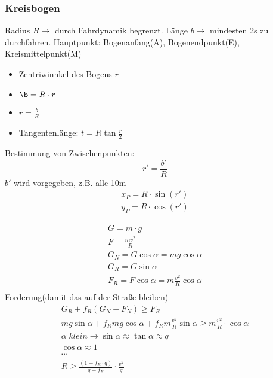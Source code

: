 \documentclass[12pt]{article}
\begin{document}
\subsubsection{Kreisbogen}
Radius $R \longrightarrow$ durch Fahrdynamik begrenzt. \newline
Länge $b \longrightarrow$ mindesten 2s zu durchfahren. \newline
\newline
Hauptpunkt: Bogenanfang(A), Bogenendpunkt(E), Kreismittelpunkt(M) \newline
\begin{itemize}
\item Zentriwinnkel des Bogens $r$
\item $\b = R \cdot r$
\item $r = \frac{b}{R}$
\item Tangentenlänge: $t = R \tan \frac{r}{2}$
\end{itemize}
Bestimmung von Zwischenpunkten:
\begin{equation*}
r' = \frac{b'}{R}
\end{equation*}
$b'$ wird vorgegeben, z.B. alle 10m
\begin{gather*}
x_P = R \cdot \sin(r') \\
y_P = R \cdot \cos(r')
\end{gather*}
\begin{figure*}[ht]\centering
\end{figure*}
\begin{gather*}
G = m \cdot g \\
F = \frac{mv^2}{R} \\
G_N = G\cos \alpha = mg \cos \alpha \\
G_R = G \sin \alpha \\
F_R = F \cos \alpha = m \frac{v^2}{R} \cos \alpha \\
\end{gather*}
Forderung(damit das auf der Straße bleiben)
\begin{gather*}
G_R + f_R(G_N + F_N) \geq F_R \\
mg \sin \alpha + f_R mg \cos \alpha + f_R m \frac{v^2}{R} \sin \alpha \geq m\frac{v^2}{R} \cdot \cos \alpha \\
\alpha\; klein \longrightarrow \sin \alpha \approx \tan \alpha \approx q \\
\cos \alpha \approx 1 \\
\cdots \\
R \geq \frac{(1-f_R \cdot q)}{q + f_R} \cdot \frac{v^2}{g}
\end{gather*}
\end{document}
